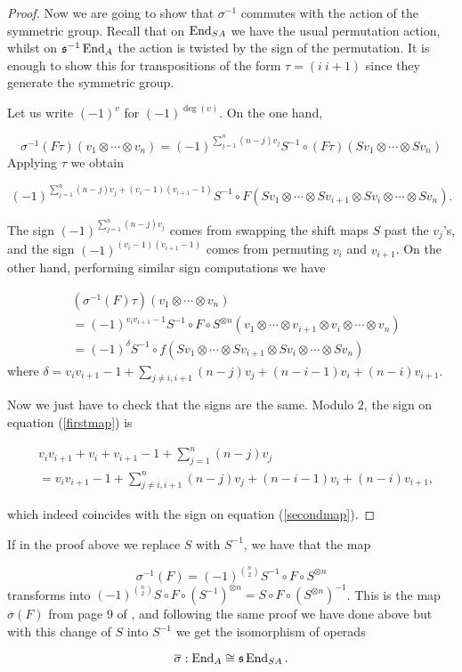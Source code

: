 \documentclass[Thesis.tex]{subfiles}
\begin{document}
\begin{proof}
Now we are going to show that $\sigma^{-1}$ commutes with the action of the symmetric group. Recall that on $\operatorname{End}_{S A}$ we have the usual permutation action, whilst on $\mathfrak{s}^{-1}\operatorname{End}_A$ the action is twisted by the sign of the permutation. It is enough to show this for transpositions of the form $\tau=(i\ i+1)$ since they generate the symmetric group.

Let us write $(-1)^v$ for $(-1)^{\deg(v)}$. On the one hand, 

\[\sigma^{-1}(F\tau)(v_1\otimes\cdots\otimes v_n)=(-1)^{\sum_{j=1}^n (n-j)v_j}S^{-1}\circ (F\tau)(S v_1\otimes\cdots\otimes S v_n)\]
Applying $\tau$ we obtain

\begin{equation}\label{firstmap}
(-1)^{\sum_{j=1}^n (n-j)v_j+(v_i-1)(v_{i+1}-1)}S^{-1}\circ F(S v_1\otimes\cdots\otimes S v_{i+1}\otimes S v_i\otimes\cdots\otimes S v_n).
\end{equation}

The sign $(-1)^{\sum_{j=1}^n (n-j)v_j}$ comes from swapping the shift maps $S$ past the $v_j$'s, and the sign $(-1)^{(v_i-1)(v_{i+1}-1)}$ comes from permuting $v_i$ and $v_{i+1}$. On the other hand, performing similar sign computations we have

\begin{align*}\label{secondmap}
&(\sigma^{-1}(F)\tau) (v_1\otimes\cdots\otimes v_n)\\
&=(-1)^{v_iv_{i+1}-1}S^{-1}\circ F\circ S^{\otimes n}(v_1\otimes\cdots\otimes v_{i+1}\otimes v_i\otimes\cdots\otimes v_n)\\\nonumber
&=(-1)^{\delta}S^{-1}\circ f(S v_1\otimes\cdots\otimes S v_{i+1}\otimes S v_i\otimes\cdots\otimes S v_n)
\end{align*}
where $\delta = v_iv_{i+1}-1+\sum_{j\neq i,i+1}(n-j)v_j +(n-i-1)v_i+(n-i)v_{i+1}$.

Now we just have to check that the signs are the same. Modulo $2$, the sign on equation (\ref{firstmap}) is 

\begin{align*}
&v_iv_{i+1}+v_i+v_{i+1}-1+\sum_{j=1}^n(n-j)v_j\\
&=v_iv_{i+1}-1+\sum_{j\neq i,i+1}^n(n-j)v_j+(n-i-1)v_i+(n-i)v_{i+1},
\end{align*}

which indeed coincides with the sign on equation (\ref{secondmap}).
\end{proof}

\begin{remark}
If in the proof above we replace $S$ with $S^{-1}$, we have that the map

\[\sigma^{-1}(F)=(-1)^{\binom{n}{2}}S^{-1}\circ F\circ S^{\otimes n}\]
 transforms into $(-1)^{\binom{n}{2}}S\circ F\circ (S^{-1})^{\otimes n}=S\circ F\circ (S^{\otimes n})^{-1}$. This is the map $\overline{\sigma}(F)$ from page 9 of \cite{RW}, and following the same proof we have done above but with this change of $S$ into $S^{-1}$ we get the isomorphism of operads

\[
\overline{\sigma}:\operatorname{End}_A\cong\mathfrak{s}\operatorname{End}_{SA}.
\]
\end{remark}
\end{document}

